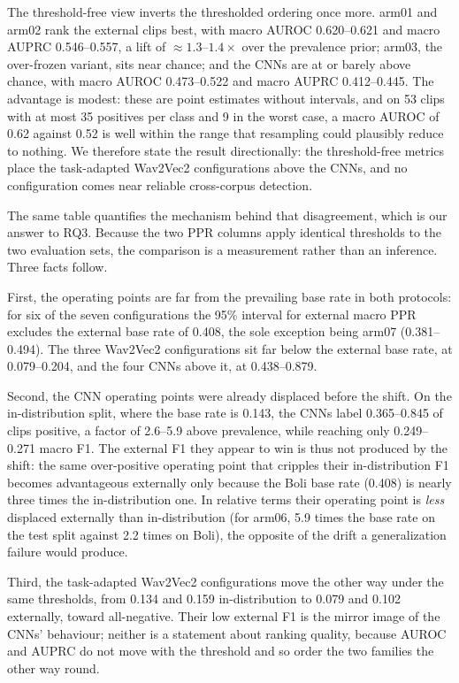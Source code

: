 \documentclass[a4paper,orivec]{llncs}
\begin{document}
The threshold-free view inverts the thresholded ordering once more. arm01 and
arm02 rank the external clips best, with macro AUROC 0.620--0.621 and macro AUPRC
0.546--0.557, a lift of ${\approx}1.3$--$1.4\times$ over the prevalence prior;
arm03, the over-frozen variant, sits near chance; and the CNNs are at or barely
above chance, with macro AUROC 0.473--0.522 and macro AUPRC 0.412--0.445. The
advantage is modest: these are point estimates without
intervals, and on 53 clips with at most 35 positives per class and 9 in the worst
case, a macro AUROC of 0.62 against 0.52 is well within the range that resampling
could plausibly reduce to nothing. We therefore state the result directionally:
the threshold-free metrics place the task-adapted Wav2Vec2
configurations above the CNNs, and no configuration comes near reliable
cross-corpus detection.

The same table quantifies the mechanism behind that disagreement, which is our
answer to RQ3. Because the two PPR columns apply identical thresholds to the two
evaluation sets, the comparison is a measurement rather than an inference. Three
facts follow.

First, the operating points are far from the prevailing base rate in both
protocols: for six of the seven configurations the 95\% interval for external
macro PPR excludes the external base rate of 0.408, the sole exception being
arm07 (0.381--0.494). The three Wav2Vec2 configurations sit far below the
external base rate, at 0.079--0.204, and the four CNNs above it, at 0.438--0.879.

Second, the CNN operating points were already displaced
before the shift. On the in-distribution split, where the base rate is 0.143, the
CNNs label 0.365--0.845 of clips positive, a factor of 2.6--5.9 above prevalence,
while reaching only 0.249--0.271 macro F1. The external F1 they appear to win is
thus not produced by the shift: the same over-positive operating point that
cripples their in-distribution F1 becomes advantageous externally only because the
Boli base rate (0.408) is nearly three times the in-distribution one. In relative
terms their operating point is \emph{less} displaced externally than
in-distribution (for arm06, 5.9 times the base rate on the test split against 2.2
times on Boli), the opposite of the drift a generalization failure would produce.

Third, the task-adapted Wav2Vec2 configurations move the other way under the same
thresholds, from 0.134 and 0.159 in-distribution to 0.079 and 0.102 externally,
toward all-negative. Their low external F1 is the mirror image of the CNNs'
behaviour; neither is a statement about ranking quality, because AUROC and AUPRC
do not move with the threshold and so order the two families the other way
round.
\end{document}
